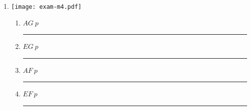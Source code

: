\documentclass[12pt]{article}
\newenvironment{problem}[2][Problem]{\begin{trivlist}
\item[\hskip \labelsep {\bfseries #1}\hskip \labelsep {\bfseries #2.}]}{\end{trivlist}}
\begin{document}
\begin{problem}{CTL Properties. 16 points total (1 point each)}
\begin{enumerate}[label=\Alph*.]
\begin{multicols}{4}
\begin{enumerate}[label=\roman*.]
\item $AG \ p$ \ \ \rule{1.4cm}{0.15mm}
\item $EG \ p$ \ \ \rule{1.4cm}{0.15mm}
\item $AF \ p$ \ \ \rule{1.4cm}{0.15mm}
\item $EF \ p$ \ \ \rule{1.4cm}{0.15mm}

\end{enumerate}
\end{multicols} 

~\\

\item  

\hspace{4cm}\texttt{[image: exam-m4.pdf]}

\begin{multicols}{4}
\begin{enumerate}[label=\roman*.]

\item $AG \ p$ \ \ \rule{1.4cm}{0.15mm}
\item $EG \ p$ \ \ \rule{1.4cm}{0.15mm}
\item $AF \ p$ \ \ \rule{1.4cm}{0.15mm}
\item $EF \ p$ \ \ \rule{1.4cm}{0.15mm}

\end{enumerate}
\end{multicols}

\end{enumerate}

\end{problem}
\end{document}
